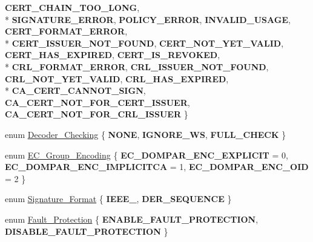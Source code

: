 \begin{DoxyCompactItemize}
{\bfseries C\-E\-R\-T\-\_\-\-C\-H\-A\-I\-N\-\_\-\-T\-O\-O\-\_\-\-L\-O\-N\-G}, 
\\*
{\bfseries S\-I\-G\-N\-A\-T\-U\-R\-E\-\_\-\-E\-R\-R\-O\-R}, 
{\bfseries P\-O\-L\-I\-C\-Y\-\_\-\-E\-R\-R\-O\-R}, 
{\bfseries I\-N\-V\-A\-L\-I\-D\-\_\-\-U\-S\-A\-G\-E}, 
{\bfseries C\-E\-R\-T\-\_\-\-F\-O\-R\-M\-A\-T\-\_\-\-E\-R\-R\-O\-R}, 
\\*
{\bfseries C\-E\-R\-T\-\_\-\-I\-S\-S\-U\-E\-R\-\_\-\-N\-O\-T\-\_\-\-F\-O\-U\-N\-D}, 
{\bfseries C\-E\-R\-T\-\_\-\-N\-O\-T\-\_\-\-Y\-E\-T\-\_\-\-V\-A\-L\-I\-D}, 
{\bfseries C\-E\-R\-T\-\_\-\-H\-A\-S\-\_\-\-E\-X\-P\-I\-R\-E\-D}, 
{\bfseries C\-E\-R\-T\-\_\-\-I\-S\-\_\-\-R\-E\-V\-O\-K\-E\-D}, 
\\*
{\bfseries C\-R\-L\-\_\-\-F\-O\-R\-M\-A\-T\-\_\-\-E\-R\-R\-O\-R}, 
{\bfseries C\-R\-L\-\_\-\-I\-S\-S\-U\-E\-R\-\_\-\-N\-O\-T\-\_\-\-F\-O\-U\-N\-D}, 
{\bfseries C\-R\-L\-\_\-\-N\-O\-T\-\_\-\-Y\-E\-T\-\_\-\-V\-A\-L\-I\-D}, 
{\bfseries C\-R\-L\-\_\-\-H\-A\-S\-\_\-\-E\-X\-P\-I\-R\-E\-D}, 
\\*
{\bfseries C\-A\-\_\-\-C\-E\-R\-T\-\_\-\-C\-A\-N\-N\-O\-T\-\_\-\-S\-I\-G\-N}, 
{\bfseries C\-A\-\_\-\-C\-E\-R\-T\-\_\-\-N\-O\-T\-\_\-\-F\-O\-R\-\_\-\-C\-E\-R\-T\-\_\-\-I\-S\-S\-U\-E\-R}, 
{\bfseries C\-A\-\_\-\-C\-E\-R\-T\-\_\-\-N\-O\-T\-\_\-\-F\-O\-R\-\_\-\-C\-R\-L\-\_\-\-I\-S\-S\-U\-E\-R}
 \}
\item 
enum \hyperlink{namespaceBotan_acd5baf937a9984c39f8b44104dde76ae}{Decoder\-\_\-\-Checking} \{ {\bfseries N\-O\-N\-E}, 
{\bfseries I\-G\-N\-O\-R\-E\-\_\-\-W\-S}, 
{\bfseries F\-U\-L\-L\-\_\-\-C\-H\-E\-C\-K}
 \}
\item 
enum \hyperlink{namespaceBotan_ad0ee6307c8f311388a2bc00426a7f858}{E\-C\-\_\-\-Group\-\_\-\-Encoding} \{ {\bfseries E\-C\-\_\-\-D\-O\-M\-P\-A\-R\-\_\-\-E\-N\-C\-\_\-\-E\-X\-P\-L\-I\-C\-I\-T} = 0, 
{\bfseries E\-C\-\_\-\-D\-O\-M\-P\-A\-R\-\_\-\-E\-N\-C\-\_\-\-I\-M\-P\-L\-I\-C\-I\-T\-C\-A} = 1, 
{\bfseries E\-C\-\_\-\-D\-O\-M\-P\-A\-R\-\_\-\-E\-N\-C\-\_\-\-O\-I\-D} = 2
 \}
\item 
enum \hyperlink{namespaceBotan_ad8a9578625edf847cbcba3ae15648cda}{Signature\-\_\-\-Format} \{ {\bfseries I\-E\-E\-E\-\_}, 
{\bfseries D\-E\-R\-\_\-\-S\-E\-Q\-U\-E\-N\-C\-E}
 \}
\item 
enum \hyperlink{namespaceBotan_aae2b282dc87e72b73f8c55ba01d88b24}{Fault\-\_\-\-Protection} \{ {\bfseries E\-N\-A\-B\-L\-E\-\_\-\-F\-A\-U\-L\-T\-\_\-\-P\-R\-O\-T\-E\-C\-T\-I\-O\-N}, 
{\bfseries D\-I\-S\-A\-B\-L\-E\-\_\-\-F\-A\-U\-L\-T\-\_\-\-P\-R\-O\-T\-E\-C\-T\-I\-O\-N}
 \}
\item 

\end{DoxyCompactItemize}
